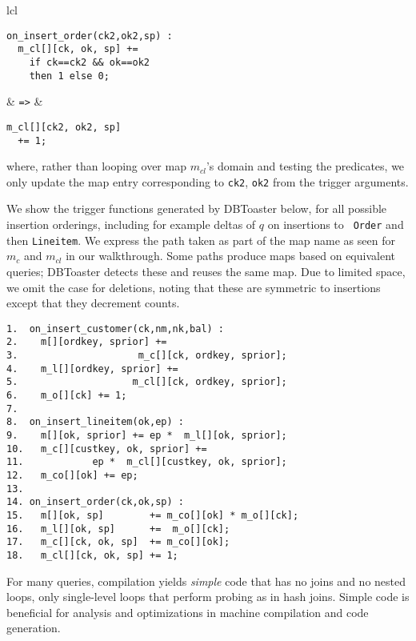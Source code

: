 \vspace{1mm}
\begin{tabular}{lcl}
\hspace{-6mm}
\begin{minipage}{1.65in}
{\footnotesize
\begin{verbatim}
on_insert_order(ck2,ok2,sp) :
  m_cl[][ck, ok, sp] +=
    if ck==ck2 && ok==ok2
    then 1 else 0;
\end{verbatim}
}
\end{minipage}
&
{\tt =>}
&
\hspace{-3.5mm}
\begin{minipage}{1.6in}
{\footnotesize
\begin{verbatim}
m_cl[][ck2, ok2, sp]
  += 1;
\end{verbatim}
}
\end{minipage}
\end{tabular}

\vspace{1mm}
\noindent where, rather than looping over map $m_{cl}$'s domain and testing the
predicates, we only update the map entry corresponding to {\tt ck2}, {\tt ok2}
from the trigger arguments.

We show the trigger functions generated by DBToaster below, for all possible
insertion orderings, including for example deltas of $q$ on insertions to {\tt
Order} and then {\tt Lineitem}.  We express the path taken as part of the map
name as seen for $m_{c}$ and $m_{cl}$ in our walkthrough. Some paths produce
maps based on equivalent queries; DBToaster detects these and reuses the same
map.  Due to limited space, we omit the case for deletions, noting that these
are symmetric to insertions except that they decrement counts.


{\footnotesize
\begin{verbatim}
1.  on_insert_customer(ck,nm,nk,bal) :
2.    m[][ordkey, sprior] +=
3.                     m_c[][ck, ordkey, sprior];
4.    m_l[][ordkey, sprior] +=
5.                    m_cl[][ck, ordkey, sprior];
6.    m_o[][ck] += 1;
7. 
8.  on_insert_lineitem(ok,ep) :
9.    m[][ok, sprior] += ep *  m_l[][ok, sprior];
10.   m_c[][custkey, ok, sprior] +=
11.            ep *  m_cl[][custkey, ok, sprior];
12.   m_co[][ok] += ep;
13.
14. on_insert_order(ck,ok,sp) :
15.   m[][ok, sp]        += m_co[][ok] * m_o[][ck]; 
16.   m_l[][ok, sp]      +=  m_o[][ck];
17.   m_c[][ck, ok, sp]  += m_co[][ok];
18.   m_cl[][ck, ok, sp] += 1;
\end{verbatim}
}

For many queries, compilation yields \textit{simple} code that has no joins
and no nested loops, only single-level loops that perform probing as
in hash joins.
Simple code is beneficial for analysis and optimizations in machine
compilation and code generation.

